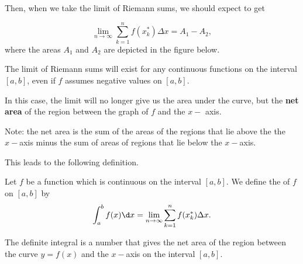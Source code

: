 \documentclass{ximera}
\begin{document}
 Then, when we take the limit of Riemann sums, we should expect to get
 
 \[
\lim_{n\to\infty}\sum_{k=1}^n f(x_k^*)\Delta x= A_1-A_2,
\]
where the areas $A_1$ and $A_2$ are depicted in the figure below.

 \begin{image}
\end{image}


The limit of Riemann sums will exist for any continuous functions on the interval $[a,b]$, even if $f$ assumes negative values on $[a,b]$.

In this case, the limit will no longer give us the area under the curve, but the \textbf{net area} of the region between the graph of $f$ and the $x-$ axis.

Note:  the net area is the sum of the areas of the regions that lie above the the $x-$axis minus the sum of  areas of regions that lie below the $x-$axis.

This leads to the following definition.
\begin{definition}
Let $f$ be a function which is continuous on the interval $[a,b]$. We define the  of $f$ on $[a,b]$ by
\[
\int_a^b f(x) \d x=\lim_{n\to\infty}\sum_{k=1}^n f(x_k^*)\Delta x.
\]
\end{definition}
The definite integral is a number that gives the net area of the region between the curve $y=f(x)$ and the $x-$axis on the interval $[a,b]$.  
 
\end{document}

